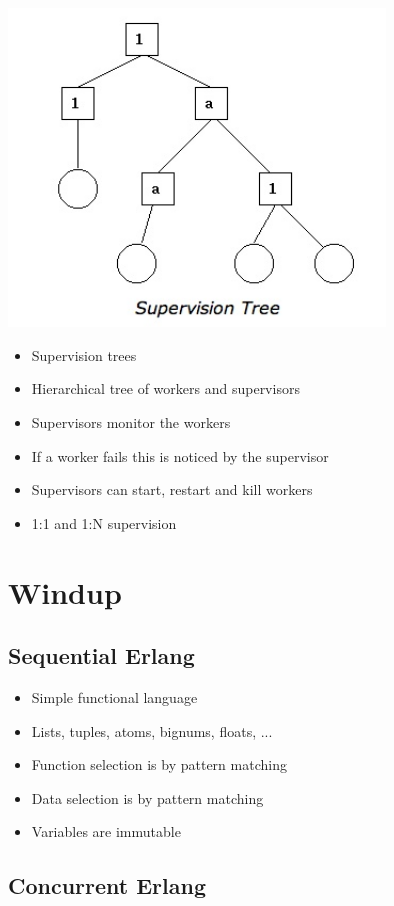 \documentclass[12pt]{article}
\begin{document}
\includegraphics[width=10cm]{images/sup.jpg}

\begin{itemize}
\item Supervision trees
\item Hierarchical tree of workers and supervisors
\item Supervisors monitor the workers
\item If a worker fails this is noticed by the supervisor
\item Supervisors can start, restart and kill workers
\item 1:1 and 1:N supervision
\end{itemize}

\section{Windup}

\subsection{Sequential Erlang}

\begin{itemize}
\item Simple functional language
\item Lists, tuples, atoms, bignums, floats, ...
\item Function selection is by pattern matching
\item Data selection is by pattern matching
\item Variables are immutable
\end{itemize}

\subsection{Concurrent Erlang}
\end{document}
